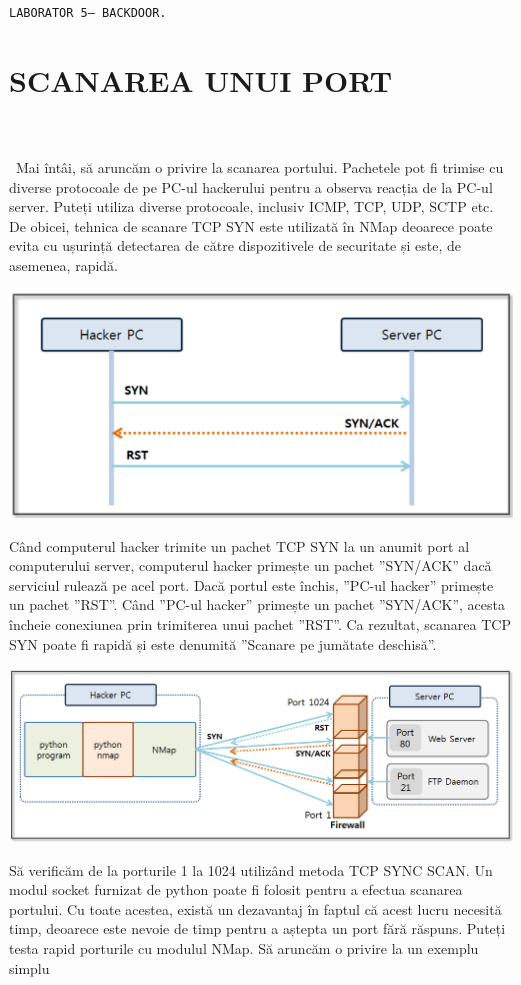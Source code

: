 \documentclass[oneside,20pt]{article}          %
\begin{document}

\noindent 
\begin{center}
  \texttt{LABORATOR 5-- BACKDOOR.}        
\end{center}

\section{SCANAREA UNUI PORT}
\noindent                 
\\\\\
Mai întâi, să aruncăm o privire la scanarea portului. Pachetele pot fi trimise cu diverse protocoale de pe PC-ul hackerului pentru a observa reacția de la PC-ul server. Puteți utiliza diverse protocoale, inclusiv ICMP, TCP, UDP, SCTP etc. De obicei, tehnica de scanare TCP SYN este utilizată în NMap deoarece poate evita cu ușurință detectarea de către dispozitivele de securitate și este, de asemenea, rapidă.
\begin{center}
\includegraphics[height=5 cm]{1.png}
\end{center}
Când computerul hacker trimite un pachet TCP SYN la un anumit port al computerului server, computerul hacker primește un pachet ”SYN/ACK” dacă serviciul rulează pe acel port. Dacă portul este închis, ”PC-ul hacker” primește un pachet ”RST”. Când ”PC-ul hacker” primește un pachet ”SYN/ACK”, acesta încheie conexiunea prin trimiterea unui pachet ”RST”. Ca rezultat, scanarea TCP SYN poate fi rapidă și este denumită ”Scanare pe jumătate deschisă”.

  \begin{center}
\includegraphics[height=5 cm]{2.png}
\end{center}
Să verificăm de la porturile 1 la 1024 utilizând metoda TCP SYNC SCAN. Un modul socket furnizat de python poate fi folosit pentru a efectua scanarea portului. Cu toate acestea, există un dezavantaj în faptul că acest lucru necesită timp, deoarece este nevoie de timp pentru a aștepta un port fără răspuns. Puteți testa rapid porturile cu modulul NMap. Să aruncăm o privire la un exemplu simplu\\
\end{document}
